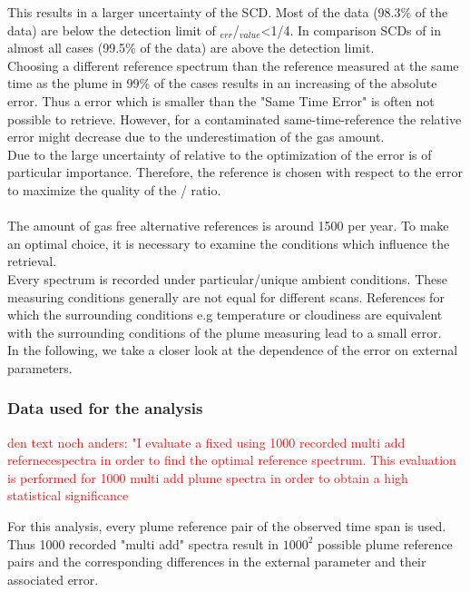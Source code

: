 %
This results in a larger uncertainty of the   SCD. Most of the  data (98.3\% of the data) are below the detection limit of $_{err}$/$_{value}$<1/4. In comparison SCDs of  in almost all cases (99.5\% of the data)  are above the detection limit. \\
%
Choosing a different reference spectrum than the reference measured at the same time as the plume in 99\% of the cases results in an increasing of the absolute error. 
Thus a  error which is smaller than the "Same Time Error" is often not  possible to retrieve. 
However, for a contaminated same-time-reference the relative error might decrease due to the underestimation of the gas amount. \\
Due to the large uncertainty of  relative to  the optimization of the  error is of particular importance. Therefore, the reference is chosen with respect to the  error to maximize the quality of the / ratio. \\
\\
The amount of gas free alternative references is around 1500 per year. To make an optimal choice, it is necessary to examine the conditions which influence the  retrieval.\\
Every spectrum is recorded under particular/unique ambient conditions. These measuring conditions generally are not equal for different scans. References for which the surrounding conditions e.g temperature or cloudiness are equivalent with the surrounding conditions of the  plume measuring lead to a small error.\\
In the following, we take a closer look at the dependence of the  error on external parameters. 
%
\subsubsection*{Data used for the analysis}
\textcolor{red}{den text noch anders: "I evaluate a fixed using 1000 recorded multi add refernecespectra in order to find the optimal reference spectrum. This evaluation is performed for 1000 multi add plume spectra in order to obtain a high statistical significance}


For this analysis, every plume reference pair of the observed time span is used. Thus 1000 recorded "multi add" spectra result in $1000^2$ possible plume reference pairs and the corresponding differences in the external parameter and their associated  error.


